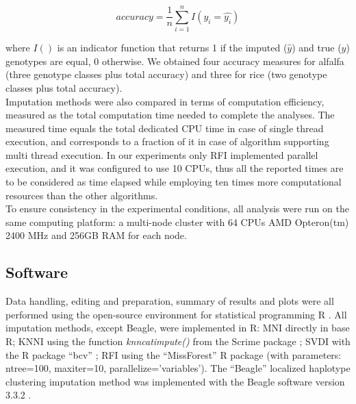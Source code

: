 \begin{equation}
\label{eq:accuracy}
accuracy = \frac{1}{n} \sum_{i=1}^{n}{I(y_i = \hat{y_i})}
\end{equation}

where $I()$ is an indicator function that returns 1 if the imputed ($\hat{y}$) and true ($y$) genotypes are equal, 0 otherwise. We obtained four accuracy measures for alfalfa (three genotype classes plus total accuracy) and three for rice (two genotype classes plus total accuracy).\\
Imputation methods were also compared in terms of computation efficiency, measured as the total computation time needed to complete the analyses. The measured time equals the total dedicated CPU time in case of single thread execution, and corresponds to a fraction of it in case of algorithm supporting multi thread execution. In our experiments only RFI implemented parallel execution, and it was configured to use 10 CPUs, thus all the reported times are to be considered as time elapsed while employing ten times more computational resources than the other algorithms.\\
To ensure consistency in the experimental conditions, all analysis were run on the same computing platform: a multi-node cluster with 64 CPUs AMD Opteron(tm) 2400 MHz and 256GB RAM for each node.
 
\subsection{Software}
\label{sec:software}
Data handling, editing and preparation, summary of results and plots were all performed using the open-source environment for statistical programming R \cite{r_core_team_r:_2014}. All imputation methods, except Beagle, were implemented in R: MNI directly in base R; KNNI using the function \emph{knncatimpute()} from the Scrime package \cite{schwender_scrime:_2013}; SVDI with the R package ``bcv'' \cite{perry_bcv:_2009}; RFI using the ``MissForest'' \cite{stekhoven_missforestnon-parametric_2012} R package (with parameters: ntree=100, maxiter=10, parallelize='variables'). The ``Beagle'' localized haplotype clustering imputation method was implemented with the Beagle software version 3.3.2 \cite{browning_rapid_2007}.
